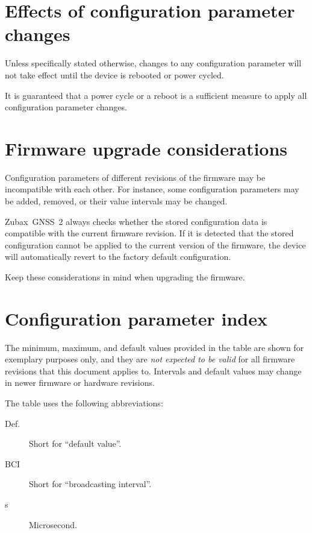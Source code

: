 \documentclass{zubaxdoc}
\begin{document}
\section{Effects of configuration parameter changes}

Unless specifically stated otherwise, changes to any configuration parameter will not take effect until
the device is rebooted or power cycled.

It is guaranteed that a power cycle or a reboot is a sufficient measure to apply all configuration parameter
changes.

\section{Firmware upgrade considerations}

Configuration parameters of different revisions of the firmware may be incompatible with each other.
For instance, some configuration parameters may be added, removed, or their value intervals may be changed.

Zubax~GNSS~2 always checks whether the stored configuration data is compatible with the current
firmware revision.
If it is detected that the stored configuration cannot be applied to the current version of the firmware,
the device will automatically revert to the factory default configuration.

Keep these considerations in mind when upgrading the firmware.

\section{Configuration parameter index}

The minimum, maximum, and default values provided in the table are shown for exemplary purposes only,
and they are \emph{not expected to be valid} for all firmware revisions that this document applies to.
Intervals and default values may change in newer firmware or hardware revisions.

The table uses the following abbreviations:
\begin{description}
\item[Def.] Short for ``default value''.
\item[BCI] Short for ``broadcasting interval''.
\item[{\textmu}s] Microsecond.
\end{description}

\newcommand\CfgParamIndexEntry[6]{%
    \CfgDef{#1} & \footnotesize{#2} & \footnotesize{\CfgListReferences{#1}} &
    \footnotesize{#3} & \footnotesize{#4} & \footnotesize{#5} & \footnotesize{#6}
    \tabularnewline
}%
\end{document}
